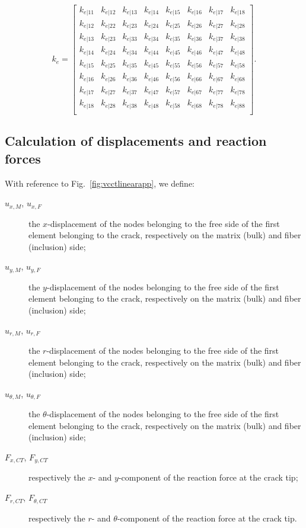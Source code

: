 \documentclass[review]{elsarticle}
\begin{document}
\begin{equation}\label{eq:elstiffmatrix}
k_{e}=\begin{bmatrix}
k_{e|11}&k_{e|12}&k_{e|13}&k_{e|14}&k_{e|15}&k_{e|16}&k_{e|17}&k_{e|18}\\
k_{e|12}&k_{e|22}&k_{e|23}&k_{e|24}&k_{e|25}&k_{e|26}&k_{e|27}&k_{e|28}\\
k_{e|13}&k_{e|23}&k_{e|33}&k_{e|34}&k_{e|35}&k_{e|36}&k_{e|37}&k_{e|38}\\
k_{e|14}&k_{e|24}&k_{e|34}&k_{e|44}&k_{e|45}&k_{e|46}&k_{e|47}&k_{e|48}\\
k_{e|15}&k_{e|25}&k_{e|35}&k_{e|45}&k_{e|55}&k_{e|56}&k_{e|57}&k_{e|58}\\
k_{e|16}&k_{e|26}&k_{e|36}&k_{e|46}&k_{e|56}&k_{e|66}&k_{e|67}&k_{e|68}\\
k_{e|17}&k_{e|27}&k_{e|37}&k_{e|47}&k_{e|57}&k_{e|67}&k_{e|77}&k_{e|78}\\
k_{e|18}&k_{e|28}&k_{e|38}&k_{e|48}&k_{e|58}&k_{e|68}&k_{e|78}&k_{e|88}\\
\end{bmatrix}.
\end{equation}

\subsection{Calculation of displacements and reaction forces}

With reference to Fig.~\ref{fig:vcctlinearapp}, we define:

\begin{description}
\item[$u_{x,M}$, $u_{x,F}$] the $x$-displacement of the nodes belonging to the free side of the first element belonging to the crack, respectively on the matrix (bulk) and fiber (inclusion) side;
\item[$u_{y,M}$, $u_{y,F}$] the $y$-displacement of the nodes belonging to the free side of the first element belonging to the crack, respectively on the matrix (bulk) and fiber (inclusion) side;
\item[$u_{r,M}$, $u_{r,F}$] the $r$-displacement of the nodes belonging to the free side of the first element belonging to the crack, respectively on the matrix (bulk) and fiber (inclusion) side;
\item[$u_{\theta,M}$, $u_{\theta,F}$] the $\theta$-displacement of the nodes belonging to the free side of the first element belonging to the crack, respectively on the matrix (bulk) and fiber (inclusion) side;
\item[$F_{x,CT}$, $F_{y,CT}$] respectively the $x$- and $y$-component of the reaction force at the crack tip;
\item[$F_{r,CT}$, $F_{\theta,CT}$] respectively the $r$- and $\theta$-component of the reaction force at the crack tip.
\end{description}
\end{document}

